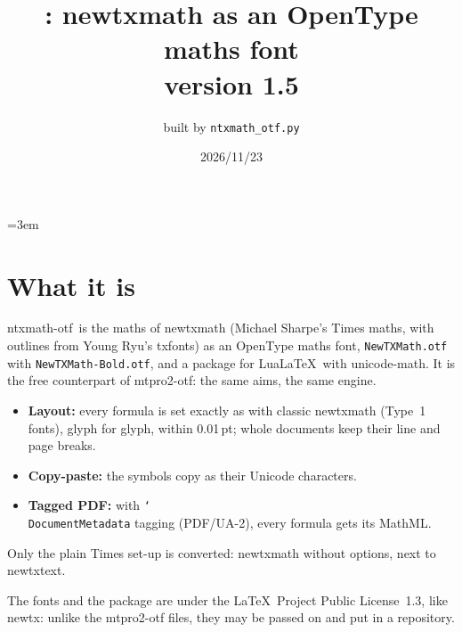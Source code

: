 \documentclass[11pt,a4paper]{article}
\title{\pkg: newtxmath as an OpenType maths font\\[2pt]\large version 1.5}
\author{built by \texttt{ntxmath\_otf.py}}
\date{2026/11/23}
\newcommand\pkg{\textsf{ntxmath-otf}}
\newcommand\cs[1]{\texttt{\char`\\#1}}
\begin{document}
\emergencystretch=3em
\maketitle

\section{What it is}
\pkg\ is the maths of \textsf{newtxmath} (Michael Sharpe's Times maths, with outlines
from Young Ryu's \textsf{txfonts}) as an OpenType maths font, \texttt{NewTXMath.otf} with
\texttt{NewTXMath-Bold.otf}, and a package for Lua\LaTeX\ with \textsf{unicode-math}. It is
the free counterpart of \textsf{mtpro2-otf}: the same aims, the same engine.
\begin{itemize}
\item \textbf{Layout:} every formula is set exactly as with classic \textsf{newtxmath}
  (Type~1 fonts), glyph for glyph, within 0.01\,pt; whole documents keep their line and page
  breaks.
\item \textbf{Copy-paste:} the symbols copy as their Unicode characters.
\item \textbf{Tagged PDF:} with \cs{DocumentMetadata} tagging (PDF/UA-2), every formula gets
  its MathML.
\end{itemize}
Only the plain Times set-up is converted: \textsf{newtxmath} without options, next to
\textsf{newtxtext}.

The fonts and the package are under the \LaTeX\ Project Public License~1.3, like
\textsf{newtx}: unlike the \textsf{mtpro2-otf} files, they may be passed on and put in a
repository.
\end{document}

